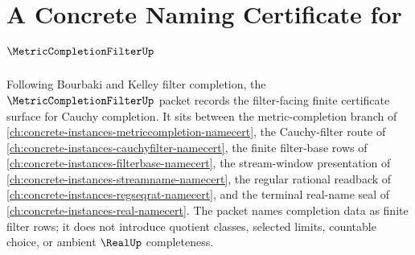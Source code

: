 \chapter{A Concrete Naming Certificate for $\MetricCompletionFilterUp$}
\label{ch:concrete-instances-metric-completion-filter-namecert}

Following Bourbaki and Kelley filter completion, the $\MetricCompletionFilterUp$ packet records the filter-facing finite certificate surface for Cauchy completion. It sits between the metric-completion branch of \autoref{ch:concrete-instances-metriccompletion-namecert}, the Cauchy-filter route of \autoref{ch:concrete-instances-cauchyfilter-namecert}, the finite filter-base rows of \autoref{ch:concrete-instances-filterbase-namecert}, the stream-window presentation of \autoref{ch:concrete-instances-streamname-namecert}, the regular rational readback of \autoref{ch:concrete-instances-regseqrat-namecert}, and the terminal real-name seal of \autoref{ch:concrete-instances-real-namecert}. The packet names completion data as finite filter rows; it does not introduce quotient classes, selected limits, countable choice, or ambient $\RealUp$ completeness.



